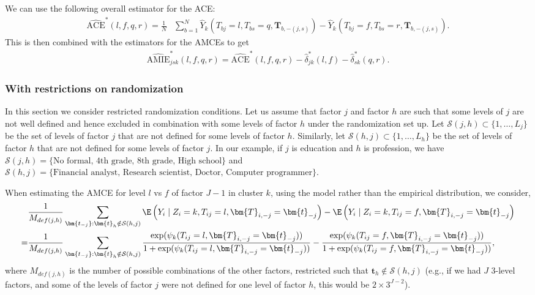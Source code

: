 We can use the following overall estimator for the ACE:
  \begin{align*}
\widehat{\text{ACE}}^*(l,f, q, r) =\frac{1}{N}&\sum_{b =1}^N \widehat{Y}_k(T_{bj}=l, T_{bs}=q, \bm{T}_{b,-(j,s)} ) -\widehat{Y}_k(T_{bj}=f, T_{bs}=r, \bm{T}_{b,-(j,s)}).
\end{align*}
This is then combined with the estimators for the AMCEs to get
\begin{align*}
\widehat{\text{AMIE}}^*_{jsk}(l,f, q, r) =\widehat{\text{ACE}}^*(l,f, q, r) -\widehat{\delta}^*_{jk}(l,f)-\widehat{\delta}^*_{sk}(q,r).
\end{align*}

\subsubsection{With restrictions on
  randomization}\label{append:fac_unrest_rand}

In this section we consider restricted randomization conditions.  Let
us assume that factor $j$ and factor $h$ are such that some levels of
$j$ are not well defined and hence excluded in combination with some
levels of factor $h$ under the randomization set up.  Let $\mathcal{S}(j, h) \subset \{1,\dots,L_j\}$
be the set of levels of factor $j$ that are not defined for some
levels of factor $h$.  Similarly, let
$\mathcal{S}(h, j) \subset \{1,\dots,L_h\}$ be the set of levels of
factor $h$ that are not defined for some levels of factor $j$.  In our
example, if $j$ is education and $h$ is profession, we have
$\mathcal{S}(j, h) = \{\text{No formal, 4th grade, 8th grade, High
  school}\}$ and
$\mathcal{S}(h, j) = \{\text{Financial analyst, Research scientist,
  Doctor, Computer programmer}\}$.
 
When estimating the AMCE for level $l$ vs $f$ of factor $J-1$ in
cluster $k$, using the model rather than the empirical distribution,
we consider,
\begin{align*}
&\frac{1}{M_{def(j,h)}}\sum_{\bm{t_{-j}}: \bm{t}_h \notin
                 \mathcal{S}(h, j)}\E\left ( Y_i\mid Z_i=k, T_{ij}=l,
                 \bm{T}_{i,-j} = \bm{t}_{-j}\right) - \E\left(Y_i\mid Z_i=k, T_{ij}=f, \bm{T}_{i,-j} = \bm{t}_{-j}\right)\\
= & \frac{1}{M_{def(j,h)}}\sum_{\bm{t_{-j}}: \bm{t}_h \notin
    \mathcal{S}(h, j)}\frac{\exp( \psi_k(T_{ij}=l, \bm{T}_{i,-j}
    =\bm{t}_{-j} ))}{1+\exp( \psi_k(T_{ij}=l, \bm{T}_{i,-j}
    =\bm{t}_{-j} ))} -\frac{\exp(  \psi_k(T_{ij}=f, \bm{T}_{i,-j}
    =\bm{t}_{-j} ))}{1+\exp( \psi_k(T_{ij}=f, \bm{T}_{i,-j}
    =\bm{t}_{-j} ))}, 
\end{align*}
where $M_{def(j,h)}$ is the number of possible combinations of the
other factors, restricted such that $\bm{t}_h \notin \mathcal{S}(h,
j)$ (e.g., if we had $J$ 3-level factors, and some of the levels of
factor $j$ were not defined for one level of factor $h$, this would be
$2 \times 3^{J-2}$). 

